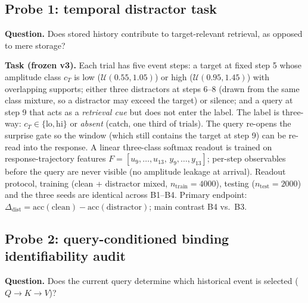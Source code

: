 \subsection{Probe 1: temporal distractor task}\label{sec:methods-probe1}

\textbf{Question.} Does stored history contribute to target-relevant
retrieval, as opposed to mere storage?

\textbf{Task (frozen v3).} Each trial has five event steps: a target at
fixed step 5 whose amplitude class $c_T$ is low
($\mathcal{U}(0.55,1.05)$) or high ($\mathcal{U}(0.95,1.45)$) with
overlapping supports; either three distractors at steps 6--8 (drawn from
the same class mixture, so a distractor may exceed the target) or
silence; and a query at step 9 that acts as a \emph{retrieval cue} but
does not enter the label.  The label is three-way:
$c_T \in \{\text{lo},\text{hi}\}$ or \emph{absent} (catch, one third of
trials).  The query re-opens the surprise gate so the window (which still
contains the target at step 9) can be re-read into the response.  A
linear three-class softmax readout is trained on response-trajectory
features $F = [u_9,\dots,u_{13},\, y_9,\dots,y_{13}]$; per-step
observables before the query are never visible (no amplitude leakage at
arrival).  Readout protocol, training (clean + distractor mixed,
$n_\text{train} = 4000$), testing ($n_\text{test} = 2000$) and the three
seeds are identical across B1--B4.  Primary endpoint:
$\Delta_{\text{dist}} = \text{acc}(\text{clean}) -
\text{acc}(\text{distractor})$; main contrast B4 vs.\ B3.

\subsection{Probe 2: query-conditioned binding identifiability audit}
\label{sec:methods-probe2}

\textbf{Question.} Does the current query determine which historical
event is selected ($Q \to K \to V$)?

